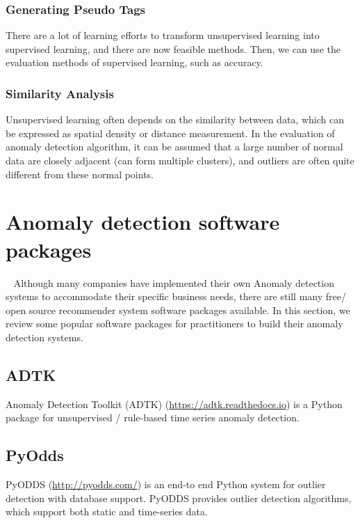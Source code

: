 \subsubsection{Generating Pseudo Tags}

There are a lot of learning efforts to transform 
unsupervised learning into supervised learning, 
and there are now feasible methods. 
Then, 
we can use the evaluation methods of supervised learning, 
such as accuracy.

\subsubsection{Similarity Analysis}

Unsupervised learning often depends 
on the similarity between data, 
which can be expressed as spatial density 
or distance measurement. 
In the evaluation of anomaly detection algorithm, 
it can be assumed that a large number of normal 
data are closely adjacent (can form multiple clusters), 
and outliers are often quite different from these normal points.

\section{Anomaly detection software packages}~\label{sec:tools}
Although many companies have implemented their own Anomaly detection systems
to accommodate their specific business needs,
there are still many free/ open source recommender system
software packages available.
In this section,
we review some popular software packages for practitioners
to build their anomaly detection systems.

\subsection{ADTK}

Anomaly Detection Toolkit (ADTK) (\href{https://adtk.readthedocs.io}{https://adtk.readthedocs.io}) is a Python package for
unsupervised / rule-based time series anomaly detection.

\subsection{PyOdds}

PyODDS (\href{http://pyodds.com/}{http://pyodds.com/}) is an end-to end Python system for
outlier detection with database support.
PyODDS provides outlier detection algorithms,
which support both static and time-series data.

